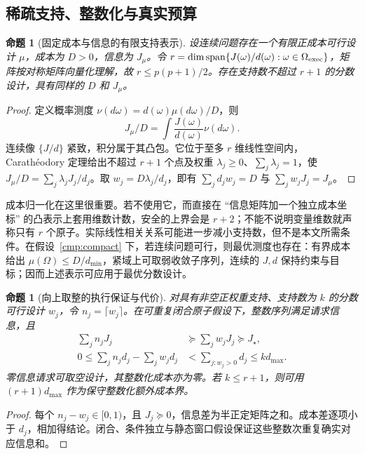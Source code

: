 \documentclass[11pt,a4paper]{article}
\numberwithin{equation}{section}
\newtheorem{proposition}[theorem]{命题}
\theoremstyle{definition}
\begin{document}
\subsection{稀疏支持、整数化与真实预算}
\label{cmp:rounding}

\begin{proposition}[固定成本与信息的有限支持表示]
\label{cmp:support}
设连续问题存在一个有限正成本可行设计 $\mu$，成本为 $D>0$，信息为 $J_\mu$。令
$r=\dim\operatorname{span}\{J(\omega)/d(\omega):\omega\in\Omega_{\rm exec}\}$，矩阵按对称矩阵向量化理解，故 $r\le p(p+1)/2$。存在支持数不超过 $r+1$ 的分数设计，具有同样的 $D$ 和 $J_\mu$。
\end{proposition}
\begin{proof}
定义概率测度 $\nu(d\omega)=d(\omega)\mu(d\omega)/D$，则
\begin{equation}
 J_\mu/D=\int \frac{J(\omega)}{d(\omega)}\nu(d\omega).
\end{equation}
连续像 $\{J/d\}$ 紧致，积分属于其凸包。它位于至多 $r$ 维线性空间内，Carath\'eodory 定理给出不超过 $r+1$ 个点及权重 $\lambda_j\ge0$、$\sum_j\lambda_j=1$，使
$J_\mu/D=\sum_j\lambda_jJ_j/d_j$。取 $w_j=D\lambda_j/d_j$，即有 $\sum_jd_jw_j=D$ 与 $\sum_jw_jJ_j=J_\mu$。
\end{proof}

成本归一化在这里很重要。若不使用它，而直接在 ``信息矩阵加一个独立成本坐标'' 的凸表示上套用维数计数，安全的上界会是 $r+2$；不能不说明变量维数就声称只有 $r$ 个原子。实际线性相关关系可能进一步减小支持数，但不是本文所需条件。在假设~\ref{cmp:compact} 下，若连续问题可行，则最优测度也存在：有界成本给出 $\mu(\Omega)\le D/d_{\min}$，紧域上可取弱收敛子序列，连续的 $J,d$ 保持约束与目标；因而上述表示可应用于最优分数设计。

\begin{proposition}[向上取整的执行保证与代价]
\label{cmp:integer}
对具有非空正权重支持、支持数为 $k$ 的分数可行设计 $w_j$，令 $n_j=\lceil w_j\rceil$。在可重复闭合原子假设下，整数序列满足请求信息，且
\begin{align}
 \sum_jn_jJ_j&\succeq\sum_jw_jJ_j\succeq J_\star,\\
 0\le\sum_jn_jd_j-\sum_jw_jd_j
 &<\sum_{j:w_j>0}d_j\le k d_{\max}.
 \label{cmp:rounding-gap}
\end{align}
零信息请求可取空设计，其整数化成本亦为零。若 $k\le r+1$，则可用 $(r+1)d_{\max}$ 作为保守整数化额外成本界。
\end{proposition}
\begin{proof}
每个 $n_j-w_j\in[0,1)$，且 $J_j\succeq0$，信息差为半正定矩阵之和。成本差逐项小于 $d_j$，相加得结论。闭合、条件独立与静态窗口假设保证这些整数次重复确实对应信息和。
\end{proof}
\end{document}
